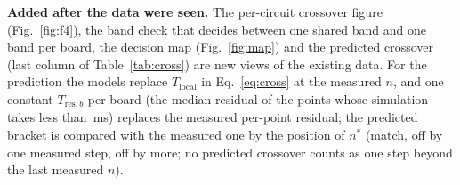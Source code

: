 \textbf{Added after the data were seen.} The per-circuit crossover figure (Fig.~\ref{fig:f4}), the band check that decides between one shared band and one band per board, the decision map (Fig.~\ref{fig:map}) and the predicted crossover (last column of Table~\ref{tab:cross}) are new views of the existing data. For the prediction the models replace $T_{\mathrm{local}}$ in Eq.~\eqref{eq:cross} at the measured $n$, and one constant $T_{\mathrm{res},b}$ per board (the median residual of the points whose simulation takes less than \SimSmallMs\,ms) replaces the measured per-point residual; the predicted bracket is compared with the measured one by the position of $n^{*}$ (match, off by one measured step, off by more; no predicted crossover counts as one step beyond the last measured $n$).
